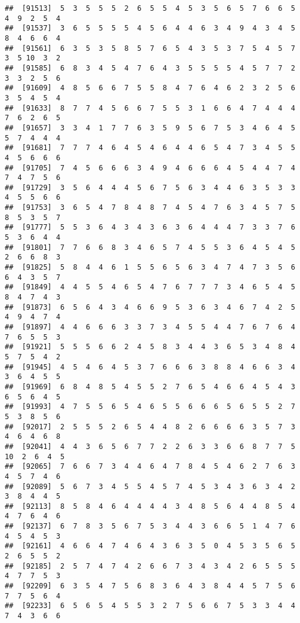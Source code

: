 \documentclass[
]{book}
\begin{document}
\begin{verbatim}
##  [91513]  5  3  5  5  5  2  6  5  5  4  5  3  5  6  5  7  6  6  5  4  9  2  5  4
##  [91537]  3  6  5  5  5  5  4  5  6  4  4  6  3  4  9  4  3  4  5  8  4  6  6  4
##  [91561]  6  3  5  3  5  8  5  7  6  5  4  3  5  3  7  5  4  5  7  3  5 10  3  2
##  [91585]  6  8  3  4  5  4  7  6  4  3  5  5  5  5  4  5  7  7  2  3  3  2  5  6
##  [91609]  4  8  5  6  6  7  5  5  8  4  7  6  4  6  2  3  2  5  6  3  5  4  5  4
##  [91633]  8  7  7  4  5  6  6  7  5  5  3  1  6  6  4  7  4  4  4  7  6  2  6  5
##  [91657]  3  3  4  1  7  7  6  3  5  9  5  6  7  5  3  4  6  4  5  5  7  4  4  4
##  [91681]  7  7  7  4  6  4  5  4  6  4  4  6  5  4  7  3  4  5  5  4  5  6  6  6
##  [91705]  7  4  5  6  6  6  3  4  9  4  6  6  6  4  5  4  4  7  4  7  4  7  5  6
##  [91729]  3  5  6  4  4  4  5  6  7  5  6  3  4  4  6  3  5  3  3  4  5  5  6  6
##  [91753]  3  6  5  4  7  8  4  8  7  4  5  4  7  6  3  4  5  7  5  8  5  3  5  7
##  [91777]  5  5  3  6  4  3  4  3  6  3  6  4  4  4  7  3  3  7  6  5  3  6  4  4
##  [91801]  7  7  6  6  8  3  4  6  5  7  4  5  5  3  6  4  5  4  5  2  6  6  8  3
##  [91825]  5  8  4  4  6  1  5  5  6  5  6  3  4  7  4  7  3  5  6  6  4  3  5  7
##  [91849]  4  4  5  5  4  6  5  4  7  6  7  7  7  3  4  6  5  4  5  8  4  7  4  3
##  [91873]  6  5  6  4  3  4  6  6  9  5  3  6  3  4  6  7  4  2  5  4  9  4  7  4
##  [91897]  4  4  6  6  6  3  3  7  3  4  5  5  4  4  7  6  7  6  4  7  6  5  5  3
##  [91921]  5  5  5  6  6  2  4  5  8  3  4  4  3  6  5  3  4  8  4  5  7  5  4  2
##  [91945]  4  5  4  6  4  5  3  7  6  6  6  3  8  8  4  6  6  3  4  3  6  4  5  5
##  [91969]  6  8  4  8  5  4  5  5  2  7  6  5  4  6  6  4  5  4  3  6  5  6  4  5
##  [91993]  4  7  5  5  6  5  4  6  5  5  6  6  6  5  6  5  5  2  7  5  3  8  5  6
##  [92017]  2  5  5  5  2  6  5  4  4  8  2  6  6  6  6  3  5  7  3  4  6  4  6  8
##  [92041]  4  4  3  6  5  6  7  7  2  2  6  3  3  6  6  8  7  7  5 10  2  6  4  5
##  [92065]  7  6  6  7  3  4  4  6  4  7  8  4  5  4  6  2  7  6  3  4  5  7  4  6
##  [92089]  5  6  7  3  4  5  5  4  5  7  4  5  3  4  3  6  3  4  2  3  8  4  4  5
##  [92113]  8  5  8  4  6  4  4  4  4  3  4  8  5  6  4  4  8  5  4  4  7  6  4  6
##  [92137]  6  7  8  3  5  6  7  5  3  4  4  3  6  6  5  1  4  7  6  4  5  4  5  3
##  [92161]  4  6  6  4  7  4  6  4  3  6  3  5  0  4  5  3  5  6  5  2  6  5  5  2
##  [92185]  2  5  7  4  7  4  2  6  6  7  3  4  3  4  2  6  5  5  5  4  7  7  5  3
##  [92209]  6  3  5  4  7  5  6  8  3  6  4  3  8  4  4  5  7  5  6  7  7  5  6  4
##  [92233]  6  5  6  5  4  5  5  3  2  7  5  6  6  7  5  3  3  4  4  7  4  3  6  6

\end{verbatim}
\end{document}
